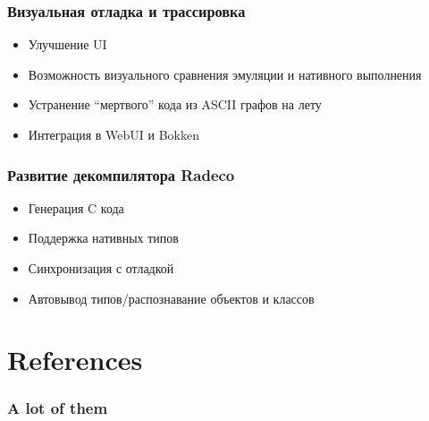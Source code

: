 \documentclass[10pt,pdf,utf8,english,compress,hyperref={unicode}]{beamer}
\begin{document}
\begin{frame}[fragile]
  \frametitle{Визуальная отладка и трассировка}
     \begin{itemize}
        \item Улучшение UI
		\item Возможность визуального сравнения эмуляции и нативного выполнения
		\item Устранение ``мертвого'' кода из ASCII графов на лету
		\item Интеграция в WebUI и Bokken 
      \end{itemize}
\end{frame}

\begin{frame}[fragile]
  \frametitle{Развитие декомпилятора Radeco}
     \begin{itemize}
        \item Генерация C кода
		\item Поддержка нативных типов
		\item Синхронизация с отладкой
		\item Автовывод типов/распознавание объектов и классов 
      \end{itemize}
\end{frame}

\ifxetex
\else
\section{References}
\begin{frame}[allowframebreaks]
	\frametitle{A lot of them}
	\printbibliography
\end{frame}
\fi
\end{document}
